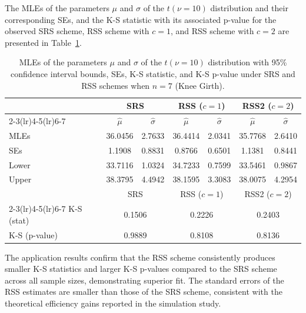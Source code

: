 \documentclass[12pt, a4paper]{article}
\begin{document}
The MLEs of the parameters $\mu$ and $\sigma$ of the $t(\nu=10)$
distribution and their corresponding SEs, and the K-S statistic with its
associated p-value for the observed SRS scheme, RSS scheme with $c = 1$,
and RSS scheme with $c = 2$ are presented in Table~\ref{tab:mle_n7}.

\begin{table}[H]
  \centering
  \caption{MLEs of the parameters $\mu$ and $\sigma$ of the
           $t(\nu=10)$ distribution with 95\% confidence interval bounds,
           SEs, K-S statistic, and K-S p-value under SRS and RSS schemes
           when $n = 7$ (Knee Girth).}
  \label{tab:mle_n7}
  \setlength{\tabcolsep}{6pt}
  \begin{tabular}{lcccccc}
    \toprule
    & \multicolumn{2}{c}{SRS}
    & \multicolumn{2}{c}{RSS ($c = 1$)}
    & \multicolumn{2}{c}{RSS2 ($c = 2$)} \\
    \cmidrule(lr){2-3}\cmidrule(lr){4-5}\cmidrule(lr){6-7}
    & $\hat{\mu}$ & $\hat{\sigma}$
    & $\hat{\mu}$ & $\hat{\sigma}$
    & $\hat{\mu}$ & $\hat{\sigma}$ \\
    \midrule
    MLEs   & 36.0456 & 2.7633 & 36.4414 & 2.0341 & 35.7768 & 2.6410 \\
    SEs    &  1.1908 & 0.8831 &  0.8766 & 0.6501 &  1.1381 & 0.8441 \\
    Lower  & 33.7116 & 1.0324 & 34.7233 & 0.7599 & 33.5461 & 0.9867 \\
    Upper  & 38.3795 & 4.4942 & 38.1595 & 3.3083 & 38.0075 & 4.2954 \\
    \midrule
    & \multicolumn{2}{c}{SRS}
    & \multicolumn{2}{c}{RSS ($c = 1$)}
    & \multicolumn{2}{c}{RSS2 ($c = 2$)} \\
    \cmidrule(lr){2-3}\cmidrule(lr){4-5}\cmidrule(lr){6-7}
    K-S (stat)    & \multicolumn{2}{c}{0.1506}
                  & \multicolumn{2}{c}{0.2226}
                  & \multicolumn{2}{c}{0.2403} \\
    K-S (p-value) & \multicolumn{2}{c}{0.9889}
                  & \multicolumn{2}{c}{0.8108}
                  & \multicolumn{2}{c}{0.8136} \\
    \bottomrule
  \end{tabular}
\end{table}

The application results confirm that the RSS scheme consistently produces
smaller K-S statistics and larger K-S p-values compared to the SRS scheme
across all sample sizes, demonstrating superior fit. The standard errors
of the RSS estimates are smaller than those of the SRS scheme, consistent
with the theoretical efficiency gains reported in the simulation study.
\end{document}
